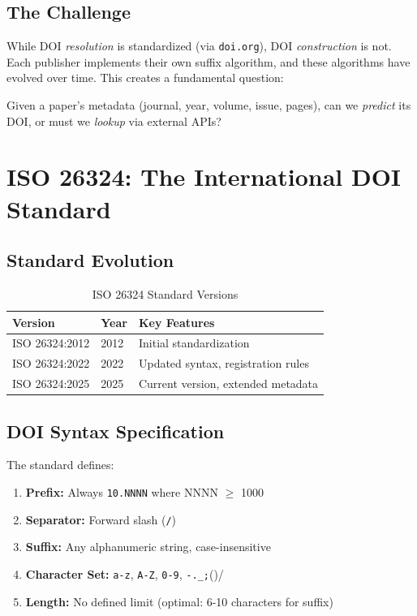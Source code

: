 \subsection{The Challenge}

While DOI \emph{resolution} is standardized (via \texttt{doi.org}), DOI \emph{construction} is not. Each publisher implements their own suffix algorithm, and these algorithms have evolved over time. This creates a fundamental question:

\begin{tcolorbox}[colback=yellow!10, colframe=orange!50, title=Central Question]
Given a paper's metadata (journal, year, volume, issue, pages), can we \emph{predict} its DOI, or must we \emph{lookup} via external APIs?
\end{tcolorbox}

\section{ISO 26324: The International DOI Standard}
\label{sec:iso-standard}

\subsection{Standard Evolution}

\begin{table}[h]
\centering
\caption{ISO 26324 Standard Versions}
\begin{tabular}{lll}
\toprule
\textbf{Version} & \textbf{Year} & \textbf{Key Features} \\
\midrule
ISO 26324:2012 & 2012 & Initial standardization \\
ISO 26324:2022 & 2022 & Updated syntax, registration rules \\
ISO 26324:2025 & 2025 & Current version, extended metadata \\
\bottomrule
\end{tabular}
\end{table}

\subsection{DOI Syntax Specification}

The standard defines:

\begin{enumerate}
    \item \textbf{Prefix:} Always \texttt{10.NNNN} where NNNN $\geq$ 1000
    \item \textbf{Separator:} Forward slash (\texttt{/})
    \item \textbf{Suffix:} Any alphanumeric string, case-insensitive
    \item \textbf{Character Set:} \texttt{a-z}, \texttt{A-Z}, \texttt{0-9}, \texttt{-.\_;}()/
    \item \textbf{Length:} No defined limit (optimal: 6-10 characters for suffix)
\end{enumerate}

